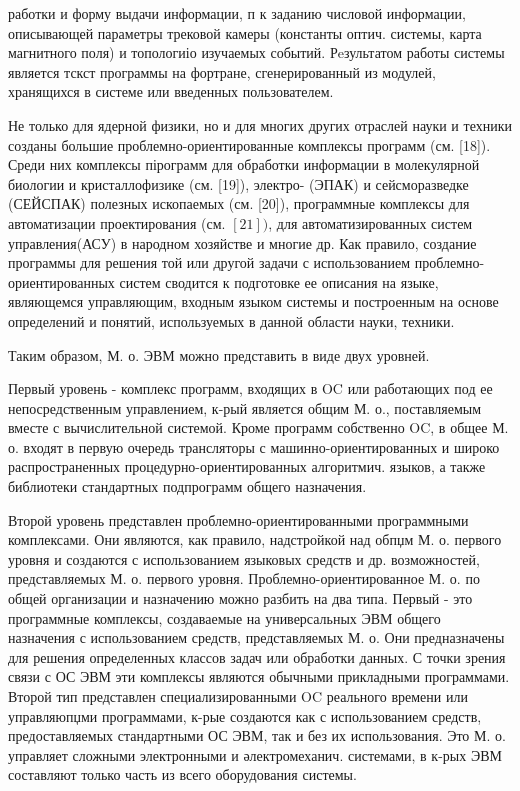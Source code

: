 \documentclass[10pt]{article}
\begin{document}
работки и форму выдачи информации, п к заданию числовой информации, описывающей параметры трековой камеры (константы оптич. системы, карта магнитного поля) и топологиіо изучаемых событий. Рeзультатом работы системы является тскст программы на фортране, сгенерированный из модулей, хранящихся в системе или введенных пользователем.



Не только для ядерной физики, но и для многих других отраслей науки и техники созданы большие проблемно-ориентированные комплексы программ (см. [18]). Среди них комплексы пірограмм для обработки информации в молекулярной биологии и кристаллофизике (см. [19]), электро- (ЭПАК) и сейсморазведке (СЕЙСПАК) полезных ископаемых (см. [20]), программные комплексы для автоматизации проектирования (см. $[21])$, для автоматизированных систем управления(АСУ) в народном хозяйстве и многие др. Как правило, создание программы для решения той или другой задачи с использованием проблемно-ориентированных систем сводится к подготовке ее описания на языке, являющемся управляющим, входным языком системы и построенным на основе определений и понятий, используемых в данной области науки, техники.



Таким образом, М. о. ЭВМ можно представить в виде двух уровней.



Первый уровень - комплекс программ, входящих в OC или работающих под ее непосредственным управлением, к-рый является общим М. о., поставляемым вместе с вычислительной системой. Кроме программ собственно OC, в общее М. о. входят в первую очередь трансляторы с машинно-ориентированных и широко распространенных процедурно-ориентированных алгоритмич. языков, а также библиотеки стандартных подпрограмм общего назначения.



Второй уровень представлен проблемно-ориентированными программными комплексами. Они являются, как правило, надстройкой над обпџм М. о. первого уровня и создаются с использованием языковых средств и др. возможностей, представляемых М. о. первого уровня. Проблемно-ориентированное М. о. по общей организации и назначению можно разбить на два типа. Первый - это программные комплексы, создаваемые на универсальных ЭВМ общего назначения с использованием средств, представляемых М. о. Они предназначены для решения определенных классов задач или обработки данных. С точки зрения связи с ОС ЭВМ эти комплексы являются обычными прикладными программами. Второй тип представлен специализированными OC реального времени или управляюпџми программами, к-рые создаются как с использованием средств, предоставляемых стандартными ОС ЭВМ, так и без их использования. Это М. о. управляет сложными электронными и әлектромеханич. системами, в к-рых ЭВМ составляют только часть из всего оборудования системы.
\end{document}
